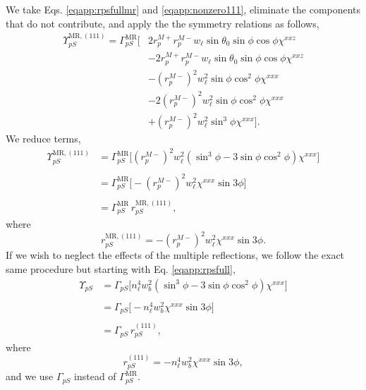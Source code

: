 We take Eqs. \eqref{eqapp:rpsfullmr} and \eqref{eqapp:nonzero111}, eliminate the
components that do not contribute, and apply the the symmetry relations as
follows,
\begin{equation*}
\begin{split}
\Upsilon^{\mathrm{MR},(111)}_{pS} = 
\Gamma^{\mathrm{MR}}_{pS}
\big[
&  2r^{M+}_{p}r^{M-}_{p}w_{\ell}\sin\theta_{0}\sin\phi\cos\phi\chi^{xxz}\\
&- 2r^{M+}_{p}r^{M-}_{p}w_{\ell}\sin\theta_{0}\sin\phi\cos\phi\chi^{xxz}\\
&-  \left(r^{M-}_{p}\right)^{2}w^{2}_{\ell}\sin\phi\cos^{2}\phi\chi^{xxx}\\
&- 2\left(r^{M-}_{p}\right)^{2}w^{2}_{\ell}\sin\phi\cos^{2}\phi\chi^{xxx}\\
&+ \left(r^{M-}_{p}\right)^{2}w^{2}_{\ell}\sin^{3}\phi\chi^{xxx}
\big].
\end{split}
\end{equation*}
We reduce terms,
\begin{equation*}
\begin{split}
\Upsilon^{\mathrm{MR},(111)}_{pS} &=
\Gamma^{\mathrm{MR}}_{pS}
\big[
\left(r^{M-}_{p}\right)^{2}w^{2}_{\ell}
      (\sin^{3}\phi - 3\sin\phi\cos^{2}\phi)\chi^{xxx}
\big]\\\\
&=
\Gamma^{\mathrm{MR}}_{pS}
\big[
- \left(r^{M-}_{p}\right)^{2}w^{2}_{\ell}\chi^{xxx}\sin3\phi
\big]\\\\
& = \Gamma^{\mathrm{MR}}_{pS}\,r^{\mathrm{MR},(111)}_{pS},
\end{split}
\end{equation*}
where
\begin{equation}\label{eqapp:final-rps.mr.111}
r^{\mathrm{MR},(111)}_{pS} = 
- \left(r^{M-}_{p}\right)^{2}w^{2}_{\ell}\chi^{xxx}\sin3\phi.
\end{equation}
If we wish to neglect the effects of the multiple reflections, we follow the
exact same procedure but starting with Eq. \eqref{eqapp:rpsfull},
\begin{equation}
\begin{split}
\Upsilon_{pS} &= 
\Gamma_{pS}
\big[
n^{4}_{\ell}w^{2}_{b}(\sin^{3}\phi - 3\sin\phi\cos^{2}\phi)\chi^{xxx}
\big]\\\\
&= \Gamma_{pS}
\big[
- n^{4}_{\ell}w^{2}_{b}\chi^{xxx}\sin3\phi
\big]\\\\
&= \Gamma_{pS}\,r^{(111)}_{pS},
\end{split}
\end{equation}
where
\begin{equation}\label{eqapp:final-rps.111}
r^{(111)}_{pS} = - n^{4}_{\ell}w^{2}_{b}\chi^{xxx}\sin3\phi,
\end{equation}
and we use $\Gamma_{pS}$ instead of $\Gamma^{\mathrm{MR}}_{pS}$.


